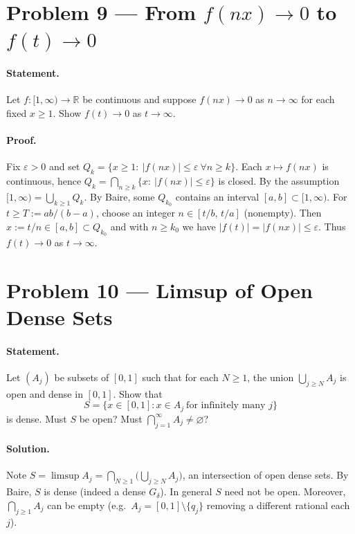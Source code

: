 \documentclass[12pt,a4paper]{article}
\theoremstyle{plain}
\theoremstyle{definition}
\theoremstyle{remark}
\theoremstyle{remark}
\begin{document}
\bigskip
\section*{Problem 9 — From $f(nx)\to0$ to $f(t)\to0$}

\paragraph{Statement.}
Let $f:[1,\infty)\to\mathbb R$ be continuous and suppose $f(n x)\to0$ as $n\to\infty$ for each fixed $x\ge1$.
Show $f(t)\to0$ as $t\to\infty$.

\paragraph{Proof.}
Fix $\varepsilon>0$ and set $Q_k=\{x\ge1:\ |f(n x)|\le\varepsilon\ \forall n\ge k\}$.
Each $x\mapsto f(n x)$ is continuous, hence $Q_k=\bigcap_{n\ge k}\{x:\ |f(n x)|\le\varepsilon\}$ is closed.
By the assumption $[1,\infty)=\bigcup_{k\ge1} Q_k$. By Baire, some $Q_{k_0}$ contains an
interval $[a,b]\subset[1,\infty)$. For $t\ge T:=ab/(b-a)$, choose an integer
$n\in[t/b,\,t/a]$ (nonempty). Then $x:=t/n\in[a,b]\subset Q_{k_0}$ and with $n\ge k_0$
we have $|f(t)|=|f(n x)|\le\varepsilon$. Thus $f(t)\to0$ as $t\to\infty$.

\bigskip
\section*{Problem 10 — Limsup of Open Dense Sets}

\paragraph{Statement.}
Let $(A_j)$ be subsets of $[0,1]$ such that for each $N\ge1$, the union $\bigcup_{j\ge N}A_j$
is open and dense in $[0,1]$. Show that
\[
S=\{x\in[0,1]: x\in A_j\ \text{for infinitely many }j\}
\]
is dense. Must $S$ be open? Must $\bigcap_{j=1}^{\infty} A_j\neq\varnothing$?

\paragraph{Solution.}
Note $S=\limsup A_j=\bigcap_{N\ge1}\big(\bigcup_{j\ge N}A_j\big)$, an intersection of open dense sets.
By Baire, $S$ is dense (indeed a dense $G_\delta$). In general $S$ need not be open.
Moreover, $\bigcap_{j\ge1}A_j$ can be empty (e.g.\ $A_j=[0,1]\setminus\{q_j\}$ removing a different rational each $j$).
\end{document}
